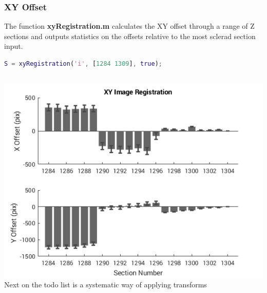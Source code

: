 \documentclass[11pt]{beamer}
\begin{document}
\begin{frame}[fragile]
	\frametitle{XY Offset}
	The function \textbf{xyRegistration.m} calculates the XY offset through a range of Z sections and outputs statistics on the offsets relative to the most sclerad section input.
	\begin{lstlisting}[language=matlab]
% S xyRegistration(source, [minZ maxZ], plotFlag);
S = xyRegistration('i', [1284 1309], true);\end{lstlisting}
	\begin{columns}
			\includegraphics[height=0.4\textheight]{xyAlign}
			Next on the todo list is a systematic way of applying transforms
	\end{columns}
\end{frame}
\end{document}

